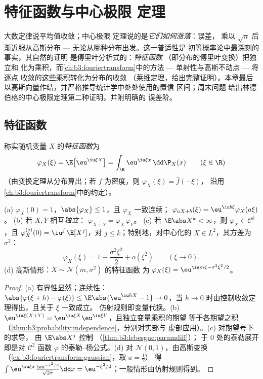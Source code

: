\chapter{特征函数与中心极限
定理}\label{ch:b3:clt}

大数定律说平均值收敛；中心极限
定理说的是\emph{它们如何涨落}：误差，
乘以 $\sqrt n$ 后渐近服从高斯分布 ---
无论从哪种分布出发。这一普适性是
初等概率论中最深刻的事实，其自然的证明
是傅里叶分析式的：\emph{特征函数}
（即分布的傅里叶变换）把独立和
化为乘积，而\cref{ch:b3:fouriertransform}中的方法
--- 单射性与高斯不动点 --- 将逐点
收敛的这些乘积转化为分布的收敛
（莱维定理，给出完整证明）。本章最后
以高斯向量作结，并严格推导统计学中处处使用的置信
区间；周末问题
给出林德伯格的中心极限定理第二种证明，并附明确的
误差阶。

\section{特征函数}

\begin{definition}\label{def:b3:clt:cf}
称实随机变量 $X$ 的\emph{特征函数}为
\[
\varphi_X(\xi) = \E\bigl[\eu^{\iu\xi X}\bigr]
= \int_\R \eu^{\iu\xi x}\,\dd\P_X(x)
\qquad (\xi \in \R)
\]
（由变换定理从分布算出；若
$f$ 为密度，则 $\varphi_X(\xi) = \hat f(-\xi)$，
沿用\cref{ch:b3:fouriertransform}中的约定）。
\end{definition}

\begin{proposition}\label{prop:b3:clt:cfbasics}
(a) $\varphi_X(0) = 1$，$\abs{\varphi_X} \leq 1$，且
$\varphi_X$ 一致连续；
$\varphi_{aX + b}(\xi) = \eu^{\iu b\xi}\varphi_X(a\xi)$。
(b) 若 $X, Y$ 相互\emph{独立}：
$\varphi_{X+Y} = \varphi_X\,\varphi_Y$。
(c) 若 $\E\abs X^k < \infty$，则 $\varphi_X \in \mathcal
C^k$，且 $\varphi_X^{(j)}(0) = \iu^j\,\E[X^j]$，对 $j \leq
k$；特别地，对中心化的 $X \in L^2$，其方差为
$\sigma^2$：
\[
\varphi_X(\xi) = 1 - \frac{\sigma^2\xi^2}{2} +
o(\xi^2) \qquad (\xi \to 0).
\]
(d) 高斯情形：$X \sim \mathcal N(m, \sigma^2)$ 的特征函数
为 $\varphi_X(\xi) = \eu^{\iu m\xi - \sigma^2\xi^2/2}$。
\end{proposition}

\begin{proof}
(a) 有界性显然；连续性：$\abs{\varphi(\xi + h)
- \varphi(\xi)} \leq \E\abs{\eu^{\iu hX} - 1} \to 0$，当 $h
\to 0$ 时由控制收敛定理得出，且关于 $\xi$ 一致成立。
仿射规则即变量代换。(b) $\eu^{\iu\xi(X+Y)} =
\eu^{\iu\xi X}\eu^{\iu\xi Y}$，且独立变量乘积的期望
等于各期望之积
（\cref{thm:b3:probability:independence}，分别对实部与
虚部应用）。(c) 对期望号下的求导，
由 $\E\abs X^j$ 控制
（\cref{thm:b3:lebesgue:paramdiff}）；
于 $0$ 处的泰勒展开即是对 $\mathcal C^2$ 函数
$\varphi$ 的泰勒–杨公式。(d) 对 $\mathcal N(0,1)$，由高斯变换
（\cref{ex:b3:fouriertransform:gaussian}，取 $a = \frac12$）
得 $\int\eu^{\iu\xi x}\frac{\eu^{-x^2/2}}{\sqrt{2\pi}}\dd
x = \eu^{-\xi^2/2}$；一般情形由仿射规则得到。
\end{proof}

